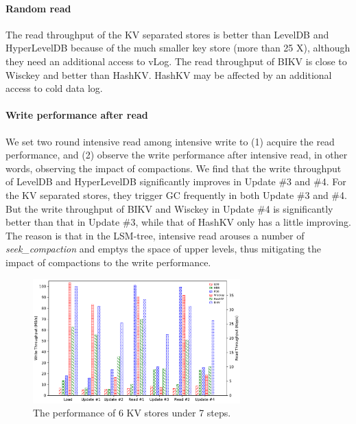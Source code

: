 \documentclass[sigconf]{acmart}
\begin{document}
\paragraph*{Random read}
The read throughput of the KV separated stores is better than LevelDB and HyperLevelDB because of the much smaller key store (more than 25 X), although they need an additional access to vLog. The read throughput of BIKV is close to Wisckey and better than HashKV. HashKV may be affected by an additional access to cold data log.

\paragraph*{Write performance after read}
We set two round intensive read among intensive write to (1) acquire the read performance, and (2) observe the write performance after intensive read, in other words, observing the impact of compactions. We find that the write throughput of LevelDB and HyperLevelDB significantly improves in Update \#3 and \#4. For the KV separated stores, they trigger GC frequently in both Update \#3 and \#4. But the write throughput of BIKV and Wisckey in Update \#4 is significantly better than that in Update \#3, while that of HashKV only has a little improving. The reason is that in the LSM-tree, intensive read arouses a number of \textit{seek\_compaction} and emptys the space of upper levels, thus mitigating the impact of compactions to the write performance.

\begin{figure}[!t]
	\setlength{\abovecaptionskip}{0.cm}	
	\setlength{\belowcaptionskip}{-0.cm}
	\centering
	\includegraphics[width=80mm]{total_performance.pdf}
	\caption{The performance of 6 KV stores under 7 steps.}
	\label{fig:pc}
\end{figure}
\end{document}
